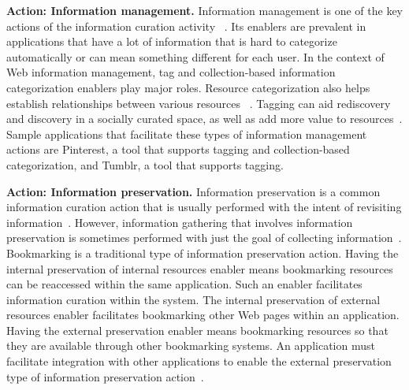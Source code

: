 \documentclass[review]{elsarticle}
\newcommand{\feature}[1]{{\ttfamily#1}}
\begin{document}
{{%
\textbf{Action: Information management.} Information management is one of the key actions of the information curation activity ~\cite{beagrie2008digital,whittaker2011personal}. Its enablers are prevalent in applications that have a lot of information that is hard to categorize automatically or can mean something different for each user. In the context of Web information management, \feature{tag} and \feature{collection-based} information categorization enablers play major roles.
%
Resource categorization also helps establish relationships between various resources ~\cite{beagrie2008digital,whittaker2011personal}. Tagging can aid rediscovery and discovery in a socially curated space, as well as add more value to resources~\cite{gruber2007ontology}. Sample applications that facilitate these types of information management actions are Pinterest, a tool that supports tagging and collection-based categorization, and Tumblr, a tool that supports tagging.

\textbf{Action: Information preservation.} Information preservation is a common information curation action that is usually performed with the intent of revisiting information~\cite{abrams1998information,whittaker2011personal}. However, information gathering that involves information preservation is sometimes performed with just the goal of collecting information~\cite{lindley2012s}. 
%
Bookmarking is a traditional type of information preservation action. Having the \feature{internal preservation of internal resources} enabler means bookmarking resources can be reaccessed within the same application. Such an enabler facilitates information curation within the system. The \feature{internal preservation of external resources} enabler facilitates bookmarking other Web pages within an application. Having the \feature{external preservation} enabler means bookmarking resources so that they are available through other bookmarking systems. An application must facilitate integration with other applications to enable the external preservation type of information preservation action~\cite{abrams1998information}.
%

}}
\end{document}
